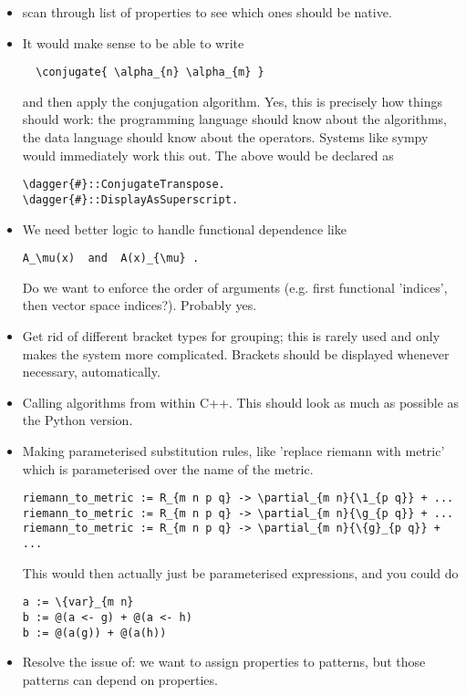 \documentclass[11pt]{article}
\begin{document}
\begin{itemize}
\item scan through list of properties to see which ones should be
native.

\item It would make sense to be able to write
\begin{lstlisting}
  \conjugate{ \alpha_{n} \alpha_{m} }
\end{lstlisting}
and then apply the conjugation algorithm. Yes, this is precisely how
things should work: the programming language should know about the
algorithms, the data language should know about the operators. Systems
like sympy would immediately work this out. The above would be
declared as
\begin{lstlisting}
\dagger{#}::ConjugateTranspose.
\dagger{#}::DisplayAsSuperscript.
\end{lstlisting}
\item We need better logic to handle functional dependence like
\begin{lstlisting}
A_\mu(x)  and  A(x)_{\mu} .
\end{lstlisting}
Do we want to enforce the order of arguments (e.g. first functional
'indices', then vector space indices?).  Probably yes.

\item Get rid of different bracket types for grouping; this is rarely used and only
makes the system more complicated. Brackets should be displayed
whenever necessary, automatically. 

\item Calling algorithms from within C++. This should look as much as possible
as the Python version.

\item Making parameterised substitution rules, like 'replace riemann with metric' 
which is parameterised over the name of the metric.
\begin{lstlisting}
riemann_to_metric := R_{m n p q} -> \partial_{m n}{\1_{p q}} + ...
riemann_to_metric := R_{m n p q} -> \partial_{m n}{\g_{p q}} + ...
riemann_to_metric := R_{m n p q} -> \partial_{m n}{\{g}_{p q}} + ...
\end{lstlisting}
This would then actually just be parameterised expressions, and you could do
\begin{lstlisting}
a := \{var}_{m n}
b := @(a <- g) + @(a <- h)
b := @(a(g)) + @(a(h))
\end{lstlisting}

\item Resolve the issue of: we want to assign properties to patterns, but those patterns can 
depend on properties.


\end{itemize}
\end{document}
